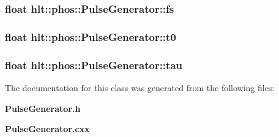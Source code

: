 \subsubsection{\setlength{\rightskip}{0pt plus 5cm}float {\bf hlt::phos::Pulse\-Generator::fs}\hspace{0.3cm}{\tt  [private]}}\label{classhlt_1_1phos_1_1PulseGenerator_r1}


\subsubsection{\setlength{\rightskip}{0pt plus 5cm}float {\bf hlt::phos::Pulse\-Generator::t0}\hspace{0.3cm}{\tt  [private]}}\label{classhlt_1_1phos_1_1PulseGenerator_r2}


\subsubsection{\setlength{\rightskip}{0pt plus 5cm}float {\bf hlt::phos::Pulse\-Generator::tau}\hspace{0.3cm}{\tt  [private]}}\label{classhlt_1_1phos_1_1PulseGenerator_r0}




The documentation for this class was generated from the following files:\begin{CompactItemize}
\item 
{\bf Pulse\-Generator.h}\item 
{\bf Pulse\-Generator.cxx}\end{CompactItemize}

